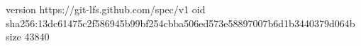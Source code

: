 version https://git-lfs.github.com/spec/v1
oid sha256:13dc61475c2f586945b99bf254cbba506ed573e58897007b6d1b3440379d064b
size 43840
